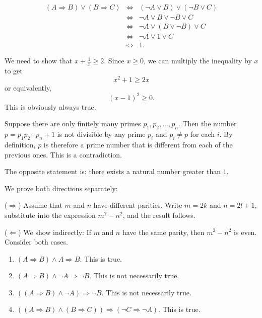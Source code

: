 \begin{answer}{1.27}

\begin{eqnarray*}
(A\Rightarrow B) \vee (B \Rightarrow C) &\Leftrightarrow & (\neg A \vee B) \vee (\neg B \vee C)\\
&\Leftrightarrow & \neg A \vee B \vee \neg B \vee C\\
&\Leftrightarrow & \neg A \vee (B \vee \neg B) \vee C\\
&\Leftrightarrow & \neg A \vee 1 \vee C\\
&\Leftrightarrow & 1.
\end{eqnarray*}
\end{answer}
\begin{answer}{1.34}
    We need to show that $x + \frac{1}{x} \geq 2$. Since $x \geq 0$, we can multiply the inequality by $x$ to get
    \[
    x^2 + 1 \geq 2x
    \]
    or equivalently,
    \[
    (x - 1)^2 \geq 0.
    \]
    This is obviously always true.
\end{answer}
\begin{answer}{1.35}
    Suppose there are only finitely many primes $p_1, p_2, \ldots, p_n$. Then the number $p = p_1 p_2 \cdots p_n + 1$ is not divisible by any prime $p_i$ and $p_i \neq p$ for each $i$. By definition, $p$ is therefore a prime number that is different from each of the previous ones. This is a contradiction.
\end{answer}
\begin{answer}{1.36}
    The opposite statement is: there exists a natural number greater than $1$.
\end{answer}
\begin{answer}{1.38}
We prove both directions separately:

($\Rightarrow$) Assume that $m$ and $n$ have different parities. Write $m = 2k$ and $n = 2l + 1$, substitute into the expression $m^2 - n^2$, and the result follows.

    ($\Leftarrow$) We show indirectly: If $m$ and $n$ have the same parity, then $m^2 - n^2$ is even. Consider both cases.
\end{answer}
\begin{answer}{1.40}
    \begin{enumerate}[label=(\roman*)]
        \item $(A \Rightarrow B) \wedge A \Rightarrow B$. This is true.
        \item  $(A \Rightarrow B) \wedge \neg A \Rightarrow \neg B$. This is not necessarily true.
        \item $((A \Rightarrow B) \wedge \neg A) \Rightarrow \neg B$. This is not necessarily true.
        \item $((A \Rightarrow B) \wedge (B \Rightarrow C)) \Rightarrow (\neg C \Rightarrow \neg A)$. This is true.
    \end{enumerate}
\end{answer}
